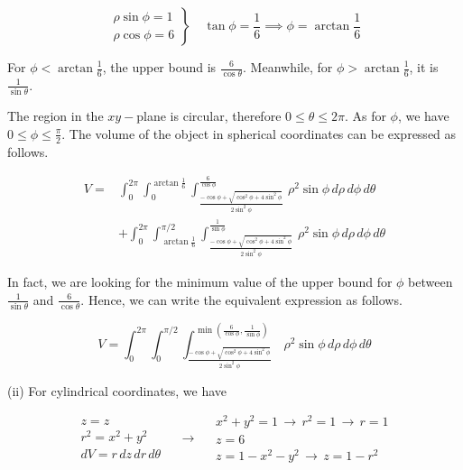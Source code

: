 \documentclass{article}
\begin{document}
\[
\left.
\begin{array}{c}
\rho\sin\phi=1\\
\rho\cos\phi=6
\end{array}
\right\}\quad\tan\phi=\frac16\implies\phi=\arctan{\frac16}
\]

\hfill

\noindent For $\displaystyle\phi<\arctan\frac16$, the upper bound is $\displaystyle \frac6{\cos\theta}$. Meanwhile, for $\displaystyle\phi>\arctan\frac16$, it is $\displaystyle \frac1{\sin\theta}$.

\hfill

\noindent The region in the $xy-$plane is circular, therefore $0\leq\theta\leq2\pi$. As for $\phi$, we have $\displaystyle0\leq\phi\leq\frac{\pi}2$. The volume of the object in spherical coordinates can be expressed as follows.

\begin{equation*}
\boxed{\begin{array}{cc}
V=&\displaystyle\int_0^{2\pi}\int_0^{\arctan{\textstyle\frac16}}\int_{\textstyle\frac{-\cos\phi +\sqrt{\cos^2\phi+4\sin^2\phi}}{2\sin^2\phi}}^{\textstyle\frac6{\cos\phi}}\,\rho^2\sin\phi\,d\rho\,d\phi\,d\theta\\
&\displaystyle+\int_0^{2\pi}\int_{\arctan{\textstyle\frac16}}^{\pi/2}\int_{\textstyle\frac{-\cos\phi +\sqrt{\cos^2\phi+4\sin^2\phi}}{2\sin^2\phi}}^{\textstyle\frac1{\sin\phi}}\,\rho^2\sin\phi\,d\rho\,d\phi\,d\theta 
\end{array}}
\end{equation*}

\hfill

\noindent In fact, we are looking for the minimum value of the upper bound for $\phi$ between $\displaystyle\frac1{\sin\theta}$ and $\displaystyle\frac6{\cos\theta}$. Hence, we can write the equivalent expression as follows.

\begin{equation*}
\boxed{V=\displaystyle\int_0^{2\pi}\int_0^{\pi/2}\int_{\textstyle\frac{-\cos\phi +\sqrt{\cos^2\phi+4\sin^2\phi}}{2\sin^2\phi}}^{\min\left(\textstyle\frac6{\cos\phi},\frac1{\sin\phi}\right)}\,\rho^2\sin\phi\,d\rho\,d\phi\,d\theta}
\end{equation*}

\hfill

\noindent (ii) For cylindrical coordinates, we have

\[
\begin{array}{c}
z=z\\
r^2=x^2+y^2\\
dV=r\,dz\,dr\,d\theta
\end{array}\quad\rightarrow\quad
\begin{array}{c}
x^2+y^2=1\,\rightarrow\,r^2 = 1\,\rightarrow\,r=1\\
z=6\\
z=1-x^2-y^2\,\rightarrow\,z=1-r^2
\end{array}
\]
\end{document}
